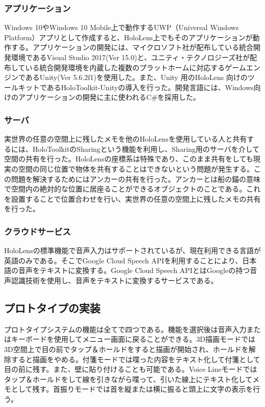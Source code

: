 \documentclass[technicalreport]{ieicej}
\begin{document}
\subsubsection{アプリケーション}
Windows 10やWindows 10 Mobile上で動作するUWP（Universal Windows Platform）アプリとして作成すると、HoloLens上でもそのアプリケーションが動作する。アプリケーションの開発には、マイクロソフト社が配布している統合開発環境であるVisual Studio 2017(Ver 15.0)と、ユニティ・テクノロジーズ社が配布している統合開発環境を内蔵した複数のプラットホームに対応するゲームエンジンであるUnity(Ver 5.6.2f1)を使用した。また、Unity 用のHoloLens 向けのツールキットであるHoloToolkit-Unity\cite{holotoolkit}の導入を行った。開発言語には、Windows向けのアプリケーションの開発に主に使われるC\#を採用した。

\subsubsection{サーバ}
実世界の任意の空間上に残したメモを他のHoloLensを使用している人と共有するには、HoloToolkitのSharingという機能を利用し、Sharing用のサーバを介して空間の共有を行った。HoloLensの座標系は特殊であり、このまま共有をしても現実の空間の同じ位置で物体を共有することはできないという問題が発生する。この問題を解決するためにはアンカーの共有を行った。アンカーとは船の錨の意味で空間内の絶対的な位置に居座ることができるオブジェクトのことである。これを設置することで位置合わせを行い、実世界の任意の空間上に残したメモの共有を行った。

\subsubsection{クラウドサービス}
HoloLensの標準機能で音声入力はサポートされているが、現在利用できる言語が英語のみである。そこでGoogle Cloud Speech API\cite{google_speech}を利用することにより、日本語の音声をテキストに変換する。Google Cloud Speech APIとはGoogleの持つ音声認識技術を使用し、音声をテキストに変換するサービスである。

\subsection{プロトタイプの実装}
プロトタイプシステムの機能は全てで四つである。機能を選択後は音声入力またはキーボードを使用してメニュー画面に戻ることができる。3D描画モードでは3D空間上で目の前でタップ＆ホールドをすると描画が開始され、ホールドを解除すると描画をやめる。付箋モードでは喋った内容をテキスト化して付箋として目の前に残す。また、壁に貼り付けることも可能である。Voice Lineモードではタップ＆ホールドをして線を引きながら喋って、引いた線上にテキスト化してメモとして残す。首振りモードでは首を縦または横に振ると頭上に文字の表示を行う。
\end{document}
